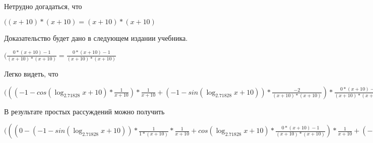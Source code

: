 \documentclass[12pt,a4paper,fleqn]{article}
\theoremstyle{definition}
\begin{document}
Нетрудно догадаться, что

$(( x  +  10 ) * ( x  +  10 ) = ( x  +  10 ) * ( x  +  10 )$

Доказательство будет дано в следующем издании учебника.

$(\frac{ 0  * ( x  +  10 ) -  1 }{( x  +  10 ) * ( x  +  10 )}
 = \frac{ 0  * ( x  +  10 ) -  1 }{( x  +  10 ) * ( x  +  10 )}
$

Легко видеть, что

$((( -1  - cos(\log_{ 2.71828 }{ x  +  10 }) * \frac{ 1 }{ x  +  10 }
) * \frac{ 1 }{ x  +  10 }
 + ( -1  - sin(\log_{ 2.71828 }{ x  +  10 })) * \frac{ -2 }{( x  +  10 ) * ( x  +  10 )}
) * \frac{ 0  * ( x  +  10 ) -  1 }{( x  +  10 ) * ( x  +  10 )}
 = (( -1  - cos(\log_{ 2.71828 }{ x  +  10 }) * \frac{ 1 }{ x  +  10 }
) * \frac{ 1 }{ x  +  10 }
 + ( -1  - sin(\log_{ 2.71828 }{ x  +  10 })) * \frac{ -2 }{( x  +  10 ) * ( x  +  10 )}
) * \frac{ 0  * ( x  +  10 ) -  1 }{( x  +  10 ) * ( x  +  10 )}
$

В результате простых рассуждений можно получить

$((( 0  - ( -1  - sin(\log_{ 2.71828 }{ x  +  10 })) * \frac{ 1 }{ 1  * ( x  +  10 )}
 * \frac{ 1 }{ x  +  10 }
 + cos(\log_{ 2.71828 }{ x  +  10 }) * \frac{ 0  * ( x  +  10 ) -  1 }{( x  +  10 ) * ( x  +  10 )}
) * \frac{ 1 }{ x  +  10 }
 + ( -1  - cos(\log_{ 2.71828 }{ x  +  10 }) * \frac{ 1 }{ x  +  10 }
) * \frac{ 0  * ( x  +  10 ) -  1 }{( x  +  10 ) * ( x  +  10 )}
 + ( 0  - cos(\log_{ 2.71828 }{ x  +  10 }) * \frac{ 1 }{ 1  * ( x  +  10 )}
) * \frac{ -2 }{( x  +  10 ) * ( x  +  10 )}
 + ( -1  - sin(\log_{ 2.71828 }{ x  +  10 })) * \frac{ 0  * ( x  +  10 ) * ( x  +  10 ) -  -2  * ( 1  * ( x  +  10 ) + ( x  +  10 ) *  1 )}{( x  +  10 ) * ( x  +  10 ) * ( x  +  10 ) * ( x  +  10 )}
) * \frac{ 1 }{ x  +  10 }
 + (( -1  - cos(\log_{ 2.71828 }{ x  +  10 }) * \frac{ 1 }{ x  +  10 }
) * \frac{ 1 }{ x  +  10 }
 + ( -1  - sin(\log_{ 2.71828 }{ x  +  10 })) * \frac{ -2 }{( x  +  10 ) * ( x  +  10 )}
) * \frac{ 0  * ( x  +  10 ) -  1 }{( x  +  10 ) * ( x  +  10 )}
 = (( 0  - ( -1  - sin(\log_{ 2.71828 }{ x  +  10 })) * \frac{ 1 }{ 1  * ( x  +  10 )}
 * \frac{ 1 }{ x  +  10 }
 + cos(\log_{ 2.71828 }{ x  +  10 }) * \frac{ 0  * ( x  +  10 ) -  1 }{( x  +  10 ) * ( x  +  10 )}
) * \frac{ 1 }{ x  +  10 }
 + ( -1  - cos(\log_{ 2.71828 }{ x  +  10 }) * \frac{ 1 }{ x  +  10 }
) * \frac{ 0  * ( x  +  10 ) -  1 }{( x  +  10 ) * ( x  +  10 )}
 + ( 0  - cos(\log_{ 2.71828 }{ x  +  10 }) * \frac{ 1 }{ 1  * ( x  +  10 )}
) * \frac{ -2 }{( x  +  10 ) * ( x  +  10 )}
 + ( -1  - sin(\log_{ 2.71828 }{ x  +  10 })) * \frac{ 0  * ( x  +  10 ) * ( x  +  10 ) -  -2  * ( 1  * ( x  +  10 ) + ( x  +  10 ) *  1 )}{( x  +  10 ) * ( x  +  10 ) * ( x  +  10 ) * ( x  +  10 )}
) * \frac{ 1 }{ x  +  10 }
 + (( -1  - cos(\log_{ 2.71828 }{ x  +  10 }) * \frac{ 1 }{ x  +  10 }
) * \frac{ 1 }{ x  +  10 }
 + ( -1  - sin(\log_{ 2.71828 }{ x  +  10 })) * \frac{ -2 }{( x  +  10 ) * ( x  +  10 )}
) * \frac{ 0  * ( x  +  10 ) -  1 }{( x  +  10 ) * ( x  +  10 )}
$
\end{document}
